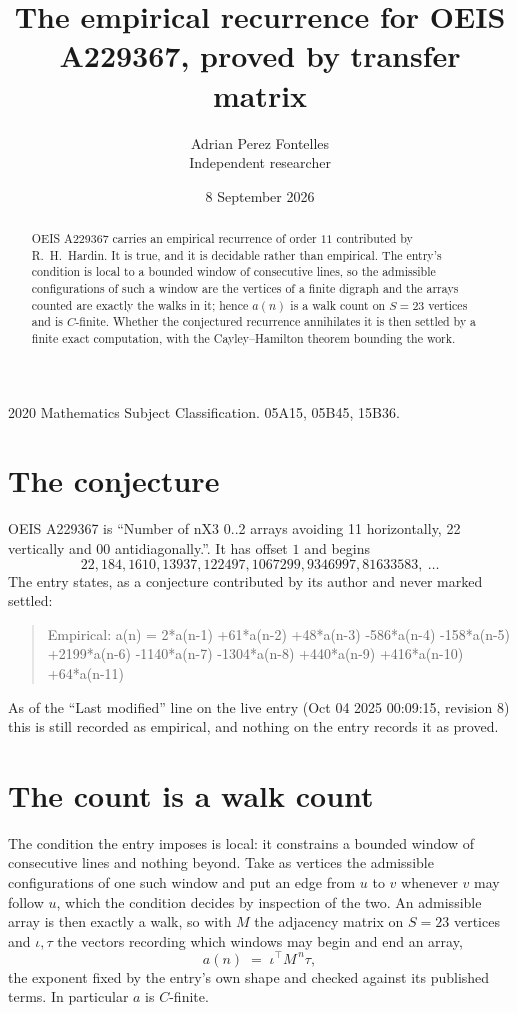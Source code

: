 \documentclass[11pt,a4paper]{article}
\title{The empirical recurrence for OEIS A229367, proved by transfer matrix}
\author{Adrian Perez Fontelles\\ \small Independent researcher}
\date{8 September 2026}
\theoremstyle{plain}
\theoremstyle{definition}
\begin{document}
\maketitle

\begin{abstract}
OEIS A229367 carries an empirical recurrence of order $11$ contributed by R.~H.~Hardin. It is
true, and it is decidable rather than empirical. The entry's condition is local to a bounded window of consecutive lines, so
the admissible configurations of such a window are the vertices of a finite digraph and the
arrays counted are exactly the walks in it; hence $a(n)$ is a walk count on $S=23$ vertices
and is $C$-finite. Whether the conjectured recurrence annihilates it is then settled by a
finite exact computation, with the Cayley--Hamilton theorem bounding the work.
\end{abstract}

\noindent\small 2020 Mathematics Subject Classification. 05A15, 05B45, 15B36.\normalsize

\section{The conjecture}

OEIS A229367 is ``Number of nX3 0..2 arrays avoiding 11 horizontally, 22 vertically and 00 antidiagonally.''. It has offset $1$ and begins
\[
22, 184, 1610, 13937, 122497, 1067299, 9346997, 81633583,\ \dots
\]
The entry states, as a conjecture contributed by its author and never marked settled:
\begin{quote}
Empirical: a(n) = 2*a(n-1) +61*a(n-2) +48*a(n-3) -586*a(n-4) -158*a(n-5) +2199*a(n-6) -1140*a(n-7) -1304*a(n-8) +440*a(n-9) +416*a(n-10) +64*a(n-11)
\end{quote}
As of the ``Last modified'' line on the live entry (Oct 04 2025 00:09:15, revision 8) this is still
recorded as empirical, and nothing on the entry records it as proved.

\section{The count is a walk count}

The condition the entry imposes is local: it constrains a bounded window of consecutive lines and nothing beyond. Take as
vertices the admissible configurations of one such window and put an edge from $u$ to $v$
whenever $v$ may follow $u$, which the condition decides by inspection of the two. An
admissible array is then exactly a walk, so with $M$ the adjacency matrix on $S=23$ vertices
and $\iota,\tau$ the vectors recording which windows may begin and end an array,
\[
a(n)\;=\;\iota^{\!\top}M^{\,n}\tau ,
\]
the exponent fixed by the entry's own shape and checked against its published terms. In
particular $a$ is $C$-finite.
\end{document}
